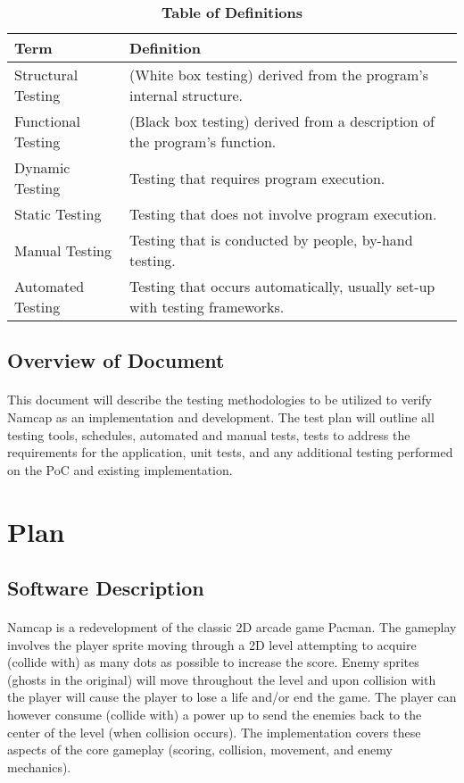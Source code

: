 \documentclass[12pt, titlepage]{article}
\begin{document}
\begin{table}[!htbp]
\caption{\textbf{Table of Definitions}} \label{Table}

\begin{tabularx}{\textwidth}{p{3cm}X}
\toprule
\textbf{Term} & \textbf{Definition}\\
\midrule
Structural Testing & (White box testing) derived from the program's internal structure.\\
Functional Testing & (Black box testing) derived from a description of the program's function.\\
Dynamic Testing & Testing that requires program execution.\\
Static Testing & Testing that does not involve program execution.\\
Manual Testing & Testing that is conducted by people, by-hand testing.\\
Automated Testing & Testing that occurs automatically, usually set-up with testing frameworks.\\
\bottomrule
\end{tabularx}

\end{table}	

\subsection{Overview of Document}
\paragraph{}
This document will describe the testing methodologies to be utilized to verify Namcap as an implementation and development. The test plan will outline all testing tools, schedules, automated and manual tests, tests to address the requirements for the application, unit tests, and any additional testing performed on the PoC and existing implementation.

\section{Plan}
	
\subsection{Software Description}
\paragraph{}
Namcap is a redevelopment of the classic 2D arcade game Pacman. The gameplay involves the player sprite moving through a 2D level attempting to acquire (collide with) as many dots as possible to increase the score. Enemy sprites (ghosts in the original) will move throughout the level and upon collision with the player will cause the player to lose a life and/or end the game. The player can however consume (collide with) a power up to send the enemies back to the center of the level (when collision occurs). The implementation covers these aspects of the core gameplay (scoring, collision, movement, and enemy mechanics).
\end{document}
